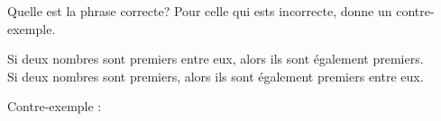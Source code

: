 %
%
Quelle est la phrase correcte? Pour celle qui ests incorrecte, donne un contre-exemple.
    \begin{qcm}
        \choice Si deux nombres sont premiers entre eux, alors ils sont également premiers.\\
        \choice Si deux nombres sont premiers, alors ils sont également premiers entre eux.
    \end{qcm}
    Contre-exemple : \dotfillbox[\linewidth]
